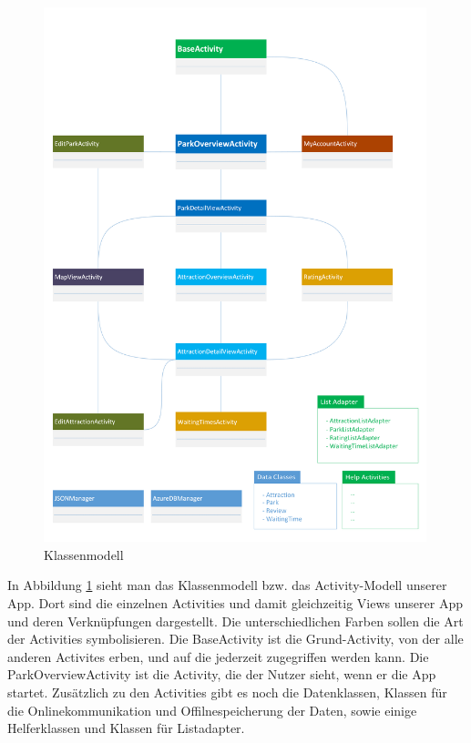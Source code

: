 \begin{figure}[htp]
	\centering
  	\includegraphics[width=0.99\textwidth]{img/modelle/Klassenmodell.png}
	\caption{Klassenmodell}
	\label{figure:architketurKlassenmodell}
\end{figure}

In Abbildung \ref{figure:architketurKlassenmodell} sieht man das Klassenmodell bzw. das Activity-Modell unserer App. Dort sind die einzelnen Activities und damit gleichzeitig Views unserer App und deren Verknüpfungen dargestellt. Die unterschiedlichen Farben sollen die Art der Activities symbolisieren. Die BaseActivity ist die Grund-Activity, von der alle anderen Activites erben, und auf die jederzeit zugegriffen werden kann. Die ParkOverviewActivity ist die Activity, die der Nutzer sieht, wenn er die App startet. Zusätzlich zu den Activities gibt es noch die Datenklassen, Klassen für die Onlinekommunikation und Offilnespeicherung der Daten, sowie einige Helferklassen und Klassen für Listadapter.

